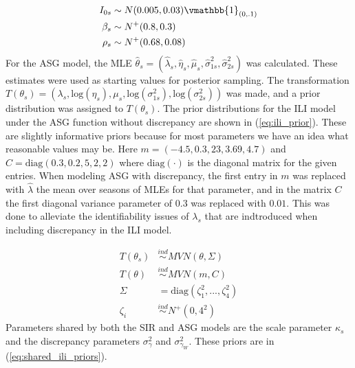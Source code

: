 \documentclass[ba]{imsart}
\theoremstyle{plain}
\theoremstyle{definition}
\theoremstyle{remark}
\begin{document}
\begin{supplement}
\begin{equation}
\begin{aligned}
    \label{eq:sir_prior}
        I_{0s} &\sim N(0.005, 0.03) \vmathbb{1}_{(0, .1)} \\
        \beta_s &\sim N^+(0.8, 0.3) \\
        \rho_s &\sim N^+(0.68, 0.08)
\end{aligned}
\end{equation}
For the ASG model, the MLE 
$\hat{\theta}_s = (\hat{\lambda}_s, \hat{\eta}_s, \hat{\mu}_s, \hat{\sigma}_{1s}^2, \hat{\sigma}_{2s}^2)$ 
was calculated. %
These estimates were used as starting values for posterior sampling. 
The transformation 
$T(\theta_s) = (\lambda_s, \text{log}(\eta_s), \mu_s, \text{log}(\sigma_{1s}^2), \text{log}(\sigma_{2s}^2))$ 
was made, and a prior distribution was assigned to $T(\theta_s)$.
The prior distributions for the ILI model under the ASG function 
without discrepancy are shown 
in (\ref{eq:ili_prior}). These are slightly informative priors because for 
most parameters we have an idea what reasonable values may be. Here 
$m = (-4.5, 0.3, 23, 3.69, 4.7)$ and $C = \text{diag}(0.3, 0.2, 5, 2, 2)$
where $\text{diag}(\cdot)$ 
is the diagonal matrix for the given entries. When modeling ASG with 
discrepancy, the first entry in $m$ was replaced with $\hat{\lambda}$ the 
mean over seasons of MLEs for that parameter, and in the matrix $C$
the first diagonal 
variance parameter of $0.3$ was replaced with $0.01$. This was done to alleviate
the identifiability issues of $\lambda_s$ that are indtroduced when including 
discrepancy in the ILI model.


\begin{equation}
\begin{aligned}
\label{eq:ili_prior}
                T(\theta_s) &\overset{ind}{\sim} MVN(\theta, \Sigma) \\
                T(\theta) &\overset{ind}{\sim} MVN(m, C)\\
                \Sigma &= \text{diag}(\zeta^2_1,...,\zeta^2_4) \\
                \zeta_i &\overset{ind}{\sim} N^+(0,4^2)
\end{aligned}
\end{equation}
Parameters shared by both the SIR and ASG models are the scale parameter 
$\kappa_s$ and the discrepancy parameters $\sigma_{\gamma}^2$ and 
$\sigma_{\gamma_W}^2$. These priors are in (\ref{eq:shared_ili_priors}). 


\end{supplement}
\end{document}
